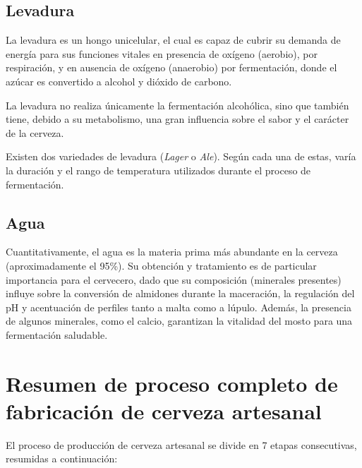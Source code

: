         \subsection{Levadura}
            \par La levadura es un hongo unicelular, el cual es capaz de cubrir su demanda de energía para sus funciones vitales en presencia de oxígeno (aerobio), por respiración, y en ausencia de oxígeno (anaerobio) por fermentación, donde el azúcar es convertido a alcohol y dióxido de carbono.
            
            \par La levadura no realiza únicamente la fermentación alcohólica, sino que también tiene, debido a su metabolismo, una gran influencia sobre el sabor y el carácter de la cerveza.
            
            \par Existen dos variedades de levadura (\textit{Lager} o \textit{Ale}). Según cada una de estas, varía la duración y el rango de temperatura utilizados durante el proceso de fermentación.
            
        \subsection{Agua}
            \par Cuantitativamente, el agua es la materia prima más abundante en la cerveza (aproximadamente el 95\%). Su obtención y tratamiento es de particular importancia para el cervecero, dado que su composición (minerales presentes) influye sobre la conversión de almidones durante la maceración, la regulación del pH y acentuación de perfiles tanto a malta como a lúpulo. Además, la presencia de algunos minerales, como el calcio, garantizan la vitalidad del mosto para una fermentación saludable.
            
    \section{Resumen de proceso completo de fabricación de cerveza artesanal}
        \par El proceso de producción de cerveza artesanal se divide en 7 etapas consecutivas, resumidas a continuación:
        
